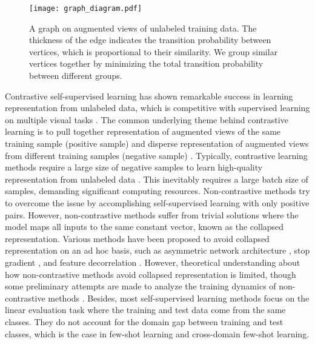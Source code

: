 \documentclass{article}
\begin{document}
\begin{figure}[ht]
    \vskip 0.2in
    \begin{center}
    \centerline{\texttt{[image: graph\_diagram.pdf]}}
    \caption{A graph on augmented views of unlabeled training data. The thickness of the edge indicates the transition probability between vertices, which is proportional to their similarity. We group similar vertices together by minimizing the total transition probability between different groups.} \label{fig:graph}
    \end{center}
    \vskip -0.2in
\end{figure}

Contrastive self-supervised learning has shown remarkable success in learning representation from unlabeled data, which is competitive with supervised learning on multiple visual tasks \citep{tian:etal:2020contrastive,henaff:etal:2020cpcv2}. The common underlying theme behind contrastive learning is to pull together representation of augmented views of the same training sample (positive sample) and disperse   representation of augmented views from different training samples (negative sample) \citep{wu:etal:2018unsupervised,wang:isola2020}. Typically, contrastive learning methods require a large size of negative samples to learn high-quality representation from unlabeled data \citep{chen:etal:2020simclr,he:etal:2020moco}. This inevitably requires a large batch size of samples, demanding significant computing resources.  Non-contrastive methods try to overcome the issue by accomplishing self-supervised learning with only positive pairs. However, non-contrastive methods suffer from  trivial solutions where the model maps all inputs to the same constant vector, known as the collapsed representation. Various methods have been proposed to avoid collapsed representation on an ad hoc basis, such as asymmetric network architecture \citep{grill:etal:2020byol}, stop gradient \citep{chen:he2021simsiam}, and feature decorrelation \citep{ermolov:etal:2021whitening,Zbontar:etal:2021barlow,hua:etal:2021feature}. However, theoretical understanding about how non-contrastive methods avoid collapsed representation is limited, though some preliminary attempts are made to analyze the training dynamics of non-contrastive methods \citep{tian:etal:2021understanding}. Besides, most self-supervised learning methods focus on the linear evaluation task where the training and test data come from the same classes. They do not account for the domain gap between training and test classes, which is the case in few-shot learning and cross-domain few-shot learning.
\end{document}
